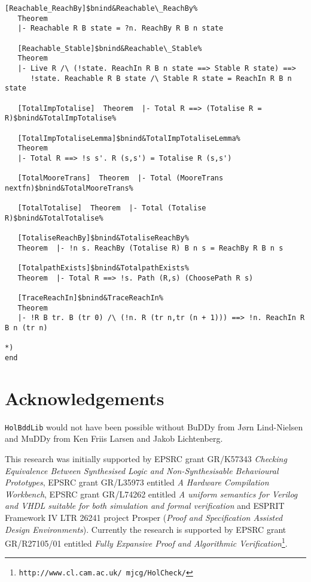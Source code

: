 \documentclass[12pt]{article}
\renewcommand{\t}[1]{\mbox{\tt #1}}
\newcommand{\Buddy}{BuDDy\xspace}
\newcommand{\Muddy}{MuDDy\xspace}
\begin{document}
\begin{footnotesize}
\begin{Verbatim}[commandchars=\$\&\%]
   [Reachable_ReachBy]$bnind&Reachable\_ReachBy%
   Theorem
   |- Reachable R B state = ?n. ReachBy R B n state
   
   [Reachable_Stable]$bnind&Reachable\_Stable%
   Theorem
   |- Live R /\ (!state. ReachIn R B n state ==> Stable R state) ==>
      !state. Reachable R B state /\ Stable R state = ReachIn R B n state
   
   [TotalImpTotalise]  Theorem  |- Total R ==> (Totalise R = R)$bnind&TotalImpTotalise%
   
   [TotalImpTotaliseLemma]$bnind&TotalImpTotaliseLemma%
   Theorem
   |- Total R ==> !s s'. R (s,s') = Totalise R (s,s')
   
   [TotalMooreTrans]  Theorem  |- Total (MooreTrans nextfn)$bnind&TotalMooreTrans%
   
   [TotalTotalise]  Theorem  |- Total (Totalise R)$bnind&TotalTotalise%
   
   [TotaliseReachBy]$bnind&TotaliseReachBy%
   Theorem  |- !n s. ReachBy (Totalise R) B n s = ReachBy R B n s
   
   [TotalpathExists]$bnind&TotalpathExists%
   Theorem  |- Total R ==> !s. Path (R,s) (ChoosePath R s)
   
   [TraceReachIn]$bnind&TraceReachIn%
   Theorem
   |- !R B tr. B (tr 0) /\ (!n. R (tr n,tr (n + 1))) ==> !n. ReachIn R B n (tr n)

*)
end
\end{Verbatim}
\end{footnotesize}

\section*{Acknowledgements}

\t{HolBddLib} would not have been possible without \Buddy from
J{\o}rn Lind-Nielsen and \Muddy from Ken Friis Larsen and Jakob Lichtenberg.

This research was initially supported by EPSRC grant
GR/K57343 {\em Checking Equivalence Between Synthesised Logic and
Non-Synthesisable Behavioural Prototypes}, EPSRC grant GR/L35973
entitled {\it A Hardware Compilation Workbench\/}, EPSRC grant
GR/L74262 entitled {\it A uniform semantics for Verilog and VHDL
suitable for both simulation and formal verification\/} and ESPRIT
Framework IV LTR 26241 project Prosper ({\em Proof and Specification
Assisted Design Environments}). Currently the research is supported by
EPSRC grant GR/R27105/01 entitled {\it Fully Expansive Proof and
Algorithmic Verification\/}\footnote{\texttt{http://www.cl.cam.ac.uk/~mjcg/HolCheck/}}.
\end{document}
